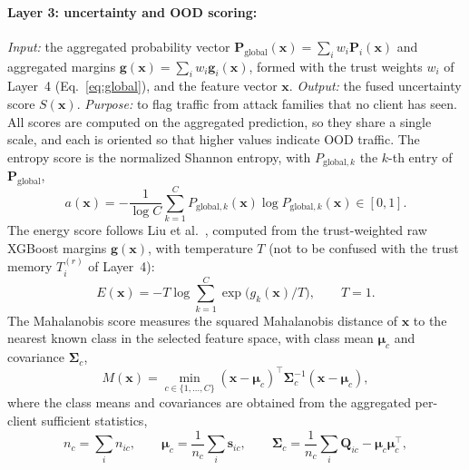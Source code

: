 \documentclass[pdflatex,sn-mathphys-num]{sn-jnl}
\begin{document}
{{\paragraph{Layer 3: uncertainty and OOD scoring:}\label{sec:layer3}
\emph{Input:} the aggregated probability vector $\mathbf{P}_{\mathrm{global}}(\mathbf{x})=\sum_{i}w_i\mathbf{P}_i(\mathbf{x})$ and aggregated margins $\mathbf{g}(\mathbf{x})=\sum_i w_i\mathbf{g}_i(\mathbf{x})$, formed with the trust weights $w_i$ of Layer~4 (Eq.~\ref{eq:global}), and the feature vector $\mathbf{x}$. \emph{Output:} the fused uncertainty score $S(\mathbf{x})$. \emph{Purpose:} to flag traffic from attack families that no client has seen. All scores are computed on the aggregated prediction, so they share a single scale, and each is oriented so that higher values indicate OOD traffic. The entropy score is the normalized Shannon entropy, with $P_{\mathrm{global},k}$ the $k$-th entry of $\mathbf{P}_{\mathrm{global}}$,
\begin{equation}
a(\mathbf{x})=-\frac{1}{\log C}\sum_{k=1}^{C}P_{\mathrm{global},k}(\mathbf{x})\log P_{\mathrm{global},k}(\mathbf{x})\in[0,1].\label{eq:entropy}
\end{equation}
The energy score follows Liu et al.\ \cite{liu2020energy}, computed from the trust-weighted raw XGBoost margins $\mathbf{g}(\mathbf{x})$, with temperature $T$ (not to be confused with the trust memory $T_i^{(r)}$ of Layer~4):
\begin{equation}
E(\mathbf{x})=-T\log\sum_{k=1}^{C}\exp\!\big(g_k(\mathbf{x})/T\big),\qquad T=1.\label{eq:energy}
\end{equation}
The Mahalanobis score measures the squared Mahalanobis distance of $\mathbf{x}$ to the nearest known class in the selected feature space, with class mean $\boldsymbol{\mu}_c$ and covariance $\boldsymbol{\Sigma}_c$,
\begin{equation}
M(\mathbf{x})=\min_{c\in\{1,\dots,C\}}(\mathbf{x}-\boldsymbol{\mu}_c)^{\top}\boldsymbol{\Sigma}_c^{-1}(\mathbf{x}-\boldsymbol{\mu}_c),\label{eq:mahal}
\end{equation}
where the class means and covariances are obtained from the aggregated per-client sufficient statistics,
\begin{equation*}
n_c=\sum_i n_{ic},\qquad \boldsymbol{\mu}_c=\frac{1}{n_c}\sum_i\mathbf{s}_{ic},\qquad \boldsymbol{\Sigma}_c=\frac{1}{n_c}\sum_i\mathbf{Q}_{ic}-\boldsymbol{\mu}_c\boldsymbol{\mu}_c^{\top},
\end{equation*}
}}
\end{document}
